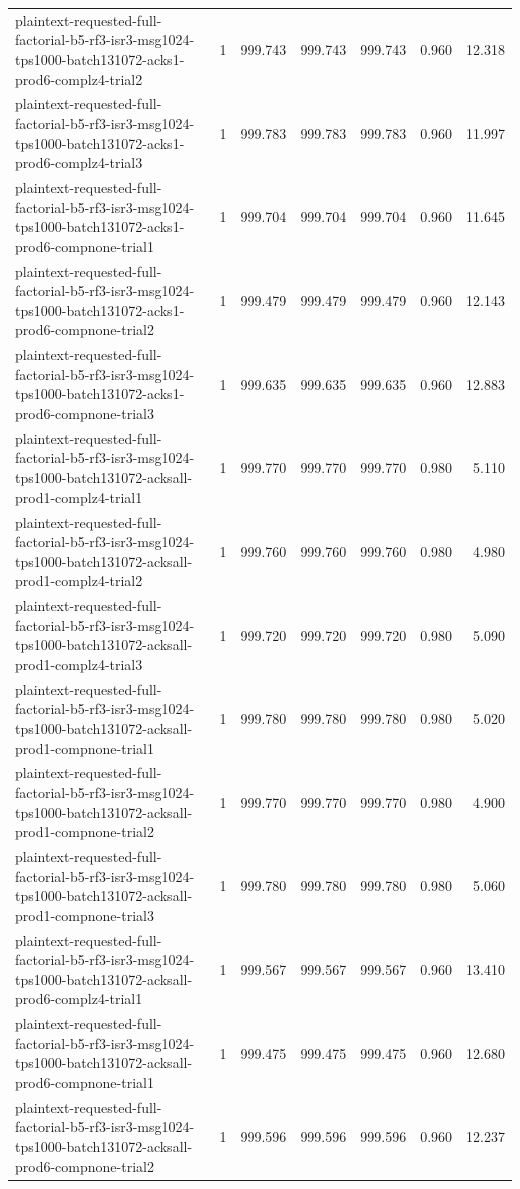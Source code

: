 \begin{tabular}{lrrrrrr}
plaintext-requested-full-factorial-b5-rf3-isr3-msg1024-tps1000-batch131072-acks1-prod6-complz4-trial2 & 1 & 999.743 & 999.743 & 999.743 & 0.960 & 12.318 \\
plaintext-requested-full-factorial-b5-rf3-isr3-msg1024-tps1000-batch131072-acks1-prod6-complz4-trial3 & 1 & 999.783 & 999.783 & 999.783 & 0.960 & 11.997 \\
plaintext-requested-full-factorial-b5-rf3-isr3-msg1024-tps1000-batch131072-acks1-prod6-compnone-trial1 & 1 & 999.704 & 999.704 & 999.704 & 0.960 & 11.645 \\
plaintext-requested-full-factorial-b5-rf3-isr3-msg1024-tps1000-batch131072-acks1-prod6-compnone-trial2 & 1 & 999.479 & 999.479 & 999.479 & 0.960 & 12.143 \\
plaintext-requested-full-factorial-b5-rf3-isr3-msg1024-tps1000-batch131072-acks1-prod6-compnone-trial3 & 1 & 999.635 & 999.635 & 999.635 & 0.960 & 12.883 \\
plaintext-requested-full-factorial-b5-rf3-isr3-msg1024-tps1000-batch131072-acksall-prod1-complz4-trial1 & 1 & 999.770 & 999.770 & 999.770 & 0.980 & 5.110 \\
plaintext-requested-full-factorial-b5-rf3-isr3-msg1024-tps1000-batch131072-acksall-prod1-complz4-trial2 & 1 & 999.760 & 999.760 & 999.760 & 0.980 & 4.980 \\
plaintext-requested-full-factorial-b5-rf3-isr3-msg1024-tps1000-batch131072-acksall-prod1-complz4-trial3 & 1 & 999.720 & 999.720 & 999.720 & 0.980 & 5.090 \\
plaintext-requested-full-factorial-b5-rf3-isr3-msg1024-tps1000-batch131072-acksall-prod1-compnone-trial1 & 1 & 999.780 & 999.780 & 999.780 & 0.980 & 5.020 \\
plaintext-requested-full-factorial-b5-rf3-isr3-msg1024-tps1000-batch131072-acksall-prod1-compnone-trial2 & 1 & 999.770 & 999.770 & 999.770 & 0.980 & 4.900 \\
plaintext-requested-full-factorial-b5-rf3-isr3-msg1024-tps1000-batch131072-acksall-prod1-compnone-trial3 & 1 & 999.780 & 999.780 & 999.780 & 0.980 & 5.060 \\
plaintext-requested-full-factorial-b5-rf3-isr3-msg1024-tps1000-batch131072-acksall-prod6-complz4-trial1 & 1 & 999.567 & 999.567 & 999.567 & 0.960 & 13.410 \\
plaintext-requested-full-factorial-b5-rf3-isr3-msg1024-tps1000-batch131072-acksall-prod6-compnone-trial1 & 1 & 999.475 & 999.475 & 999.475 & 0.960 & 12.680 \\
plaintext-requested-full-factorial-b5-rf3-isr3-msg1024-tps1000-batch131072-acksall-prod6-compnone-trial2 & 1 & 999.596 & 999.596 & 999.596 & 0.960 & 12.237 \\

\end{tabular}
